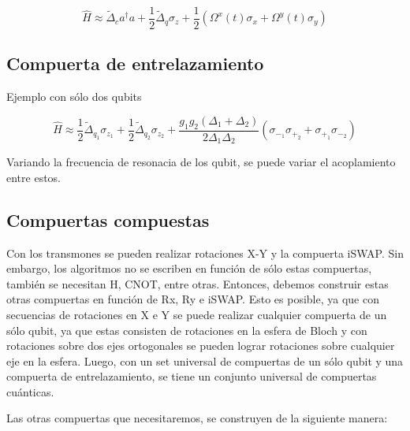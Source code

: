 $$\hat{H} \approx \tilde{\Delta}_c a^\dagger a + \frac{1}{2} \tilde{\Delta}_q \sigma_z + \frac{1}{2} (\Omega^x(t) \sigma_x + \Omega^y(t) \sigma_y)$$

\subsection{Compuerta de entrelazamiento}

Ejemplo con sólo dos qubits

$$\hat{H} \approx \frac{1}{2} \tilde{\Delta}_{q_1} \sigma_{z_1} + \frac{1}{2} \tilde{\Delta}_{q_2} \sigma_{z_2} + \frac{g_1 g_2 (\Delta_1 + \Delta_2)}{2 \Delta_1 \Delta_2} (\sigma_{-_1} \sigma_{+_2} + \sigma_{+_1} \sigma_{-_2})$$

Variando la frecuencia de resonacia de los qubit, se puede variar el acoplamiento entre estos. 

\subsection{Compuertas compuestas}

Con los transmones se pueden realizar rotaciones X-Y y la compuerta iSWAP. Sin embargo, los algoritmos no se escriben en función de sólo estas compuertas, también se necesitan H, CNOT, entre otras. Entonces, debemos construir estas otras compuertas en función de Rx, Ry e iSWAP. Esto es posible, ya que con secuencias de rotaciones en X e Y se puede realizar cualquier compuerta de un sólo qubit, ya que estas consisten de rotaciones en la esfera de Bloch y con rotaciones sobre dos ejes ortogonales se pueden lograr rotaciones sobre cualquier eje en la esfera. Luego, con un set universal de compuertas de un sólo qubit y una compuerta de entrelazamiento, se tiene un conjunto universal de compuertas cuánticas.

Las otras compuertas que necesitaremos, se construyen de la siguiente manera:


